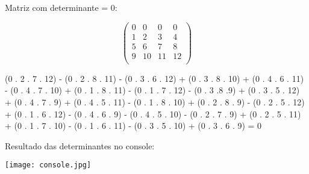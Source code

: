 \documentclass{report}
\begin{document}
Matriz com determinante = 0:

$$\left(\begin{array}{cccc} 0 & 0 & 0 & 0 \\ 1 & 2 & 3 & 4\\ 5 & 6 & 7 & 8 \\ 9 & 10 & 11 & 12 \\\end{array}\right)$$

\vspace{0,5cm}

(0 . 2 . 7 . 12) - (0 . 2 . 8 . 11) - (0 . 3 . 6 . 12) + (0 . 3 . 8 . 10) + (0 . 4 . 6 . 11) - (0 . 4 . 7 . 10) + (0 . 1 . 8 . 11) - (0 . 1 . 7 . 12) - (0 . 3 .8 .9) + (0 . 3 . 5 . 12) + (0 . 4 . 7 . 9) + (0 . 4 . 5 . 11) - (0 . 1 . 8 . 10) + (0 . 2 . 8 . 9) - (0 . 2 . 5 . 12) + (0 . 1 . 6 . 12) - (0 . 4 . 6 . 9) - (0 . 4 . 5 . 10) - (0 . 2 . 7 . 9) + (0 . 2 . 5 . 11) + (0 . 1 . 7 . 10) - (0 . 1 . 6 . 11) - (0 . 3 . 5 . 10) + (0 . 3 . 6 . 9) = 0

\vspace{0,5cm}

Resultado das determinantes no console:

\vspace{0,8cm}

\texttt{[image: console.jpg]}
\end{document}
